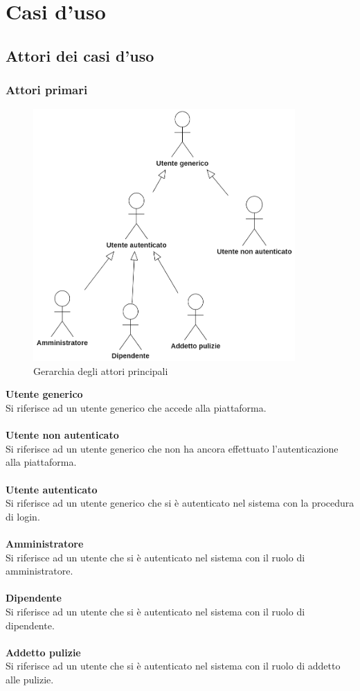 \section{Casi d'uso}

\subsection{Attori dei casi d'uso}

\subsubsection{Attori primari}
\begin{figure}[H]
		\centering
		\includegraphics[width=10cm]{res/images/utentigenerali.png}
		\caption{Gerarchia degli attori principali}
		\label{fig:Gerarchia attori principali}
	\end{figure}

\textbf{Utente generico}\\
Si riferisce ad un utente generico che accede alla piattaforma.\\
\\
\textbf{Utente non autenticato}\\
Si riferisce ad un utente generico che non ha ancora effettuato l’autenticazione alla piattaforma.\\
\\
\textbf{Utente autenticato}\\
Si riferisce ad un utente generico che si è autenticato nel sistema con la procedura di login.\\
\\
\textbf{Amministratore}\\
Si riferisce ad un utente che si è autenticato nel sistema con il ruolo di amministratore.\\
\\
\textbf{Dipendente}\\
Si riferisce ad un utente che si è autenticato nel sistema con il ruolo di dipendente.\\
\\
\textbf{Addetto pulizie}\\
Si riferisce ad un utente che si è autenticato nel sistema con il ruolo di addetto alle pulizie.\\

